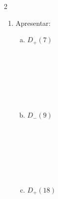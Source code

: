 \documentclass[a4paper,14pt]{article}
\begin{document}
\begin{multicols}{2}
\begin{enumerate}
\begin{enumerate}[a)]
				\item $D(6)$ \\\\\\\\\\\\\\
				\item $D(1)$ \\\\\\\\\\\\\\
				\item $D(0)$ \\\\\\\\\\\\\\
				\item $D(14)$ \newpage
				\item $D(-20)$ \\\\\\\\\\\\\\
			\end{enumerate}
			\item Apresentar:
			\begin{enumerate}[a)]
				\item $D_+(7)$ \\\\\\\\\\\\\\
				\item $D_-(9)$ \\\\\\\\\\\\\\
				\item $D_+(18)$ \\\\\\\\\\\\\\

\end{enumerate}
\end{enumerate}
\end{multicols}
\end{document}
